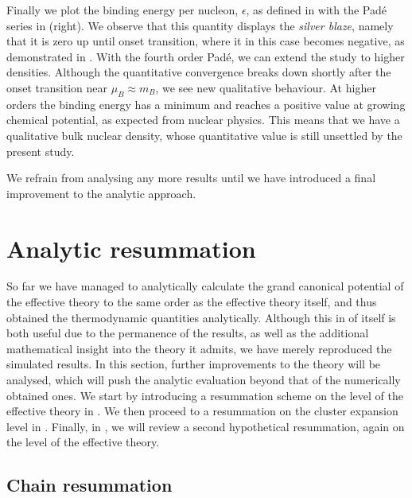 Finally we plot the binding energy per nucleon, $\epsilon$, as defined
in  with the Pad\'e series in
 (right). We observe that this quantity displays the
\emph{silver blaze}, namely that it is zero up until onset transition, where it
in this case becomes negative, as demonstrated in \citep{Langelage:2014vpa}. With
the fourth order Pad\'e, we can extend the study to higher densities. Although
the quantitative convergence breaks down shortly after the onset transition near
$\mu_B \approx m_B$, we see new qualitative behaviour. At higher orders
the binding energy has a minimum and reaches a positive value at growing
chemical potential, as expected from nuclear physics. This means that we have
a qualitative bulk nuclear density, whose quantitative value is still unsettled
by the present study.

We refrain from analysing any more results until we have introduced a final
improvement to the analytic approach.

\section{Analytic resummation} \label{sec:analytic_resummation}

So far we have managed to analytically calculate the grand canonical potential
of the effective theory to the same order as the effective theory itself, and
thus obtained the thermodynamic quantities analytically.  Although this in of
itself is both useful due to the permanence of the results, as well as the
additional mathematical insight into the theory it admits, we have merely
reproduced the simulated results. In this section, further improvements to the
theory will be analysed, which will push the analytic evaluation beyond that of
the numerically obtained ones. We start by introducing a resummation scheme on
the level of the effective theory in . We then
proceed to a resummation on the cluster expansion level in
. Finally, in ,
we will review a second hypothetical resummation, again on the level of the
effective theory.

\subsection{Chain resummation} \label{sec:chain_resummation}

